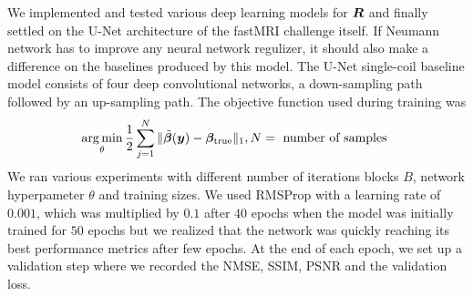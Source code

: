 \documentclass{article}
\begin{document}
We implemented and tested various deep learning models for $\bm{R}$ and finally settled on the U-Net architecture  of the fastMRI challenge itself. If Neumann network has to improve any neural network regulizer, it should also make a difference on the baselines produced by this model. The U-Net single-coil baseline model consists of four deep convolutional networks, a down-sampling path followed by an up-sampling path. The objective function used during training was
$$
	\operatorname*{arg\,min}_\theta \frac{1}{2} \sum_{j=1}^N \| \tilde{\bm{\beta}}(\bm{y}) - \bm{\beta}_{\text{true}} \|_1, N=\text{ number of samples }
$$
     We ran various experiments with different number of iterations blocks $B$, network hyperpameter $\theta$ and training sizes.
     We used RMSProp with a learning rate of $0.001$, which was multiplied by $0.1$ after $40$ epochs when the model was initially trained for $50$ epochs but we realized that the network was quickly reaching its best performance metrics after few epochs. At the end of each epoch, we set up a validation step where we recorded the NMSE, SSIM, PSNR and the validation loss.
   
\end{document}
